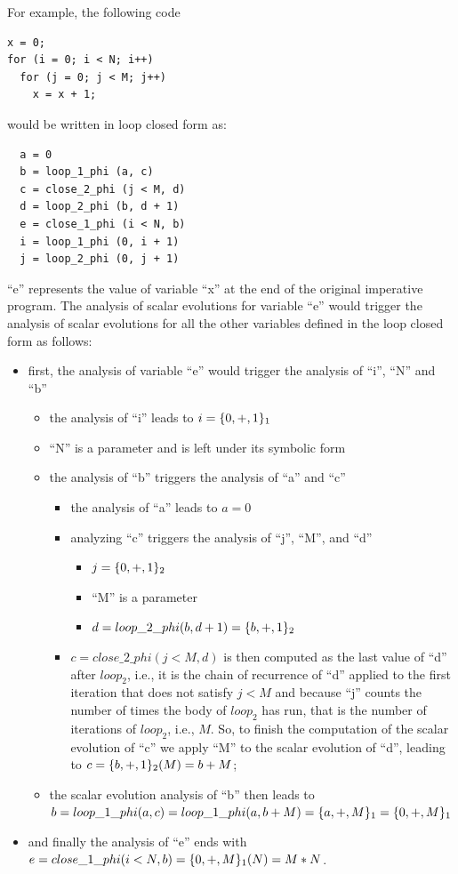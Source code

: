 For example, the following code
\begin{verbatim}
x = 0;
for (i = 0; i < N; i++)
  for (j = 0; j < M; j++)
    x = x + 1;
\end{verbatim}
would be written in loop closed \SSA{} form as:
\begin{verbatim}
  a = 0
  b = loop_1_phi (a, c)
  c = close_2_phi (j < M, d)
  d = loop_2_phi (b, d + 1)
  e = close_1_phi (i < N, b)
  i = loop_1_phi (0, i + 1)
  j = loop_2_phi (0, j + 1)
\end{verbatim}
``e'' represents the value of variable ``x'' at the end of the
original imperative program.  The analysis of scalar evolutions for
variable ``e'' would trigger the analysis of scalar evolutions for all
the other variables defined in the loop closed \SSA{} form as follows:
\begin{itemize}
\item first, the analysis of variable ``e'' would trigger the analysis
  of ``i'', ``N'' and ``b''
  \begin{itemize}
  \item the analysis of ``i'' leads to $i = \{0, +, 1\}_1$
  \item ``N'' is a parameter and is left under its symbolic form
  \item the analysis of ``b'' triggers the analysis of ``a'' and ``c''
    \begin{itemize}
    \item the analysis of ``a'' leads to $a = 0$
    \item analyzing ``c'' triggers the analysis of ``j'', ``M'', and ``d''
      \begin{itemize}
      \item $j = \{0, +, 1\}_2$
      \item ``M'' is a parameter
      \item $d = loop\_2\_phi (b, d + 1) = \{b, +, 1\}_2$
      \end{itemize}
    \item $c = close\_2\_phi (j < M, d)$ is then computed as the last value of ``d'' after
      $loop_2$, i.e., it is the chain of recurrence of ``d'' applied
      to the first iteration that does not satisfy $j < M$ and
      because ``j'' counts the number of times the body of $loop_2$
      has run, that is the number of iterations of $loop_2$, i.e.,
      $M$.  So, to finish the computation of the scalar evolution of
      ``c'' we apply ``M'' to the scalar evolution of ``d'', leading
      to $c = \{b, +, 1\}_2 (M) = b + M$;
    \end{itemize}
  \item the scalar evolution analysis of ``b'' then leads to $b =
    loop\_1\_phi (a, c) = loop\_1\_phi (a, b + M) = \{a, +, M\}_1 =
    \{0, +, M\}_1$
  \end{itemize}
\item and finally the analysis of ``e'' ends with $e = close\_1\_phi (i
  < N, b) = \{0, +, M\}_1 (N) = M * N$.
\end{itemize}

